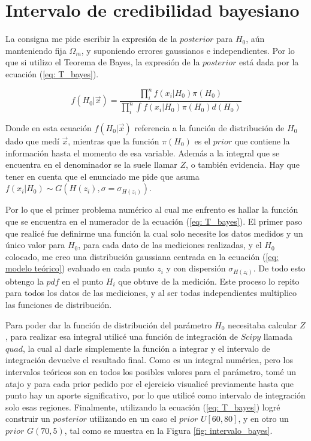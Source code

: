 \documentclass[]{article}
\begin{document}
\section{Intervalo de credibilidad bayesiano}
La consigna me pide escribir la expresión de la $posterior$ para $H_0$, aún manteniendo fija $\Omega_m$, y suponiendo errores gaussianos e independientes. Por lo que si
utilizo el Teorema de Bayes, la expresión de la $posterior$ está dada por la ecuación (\ref{eq: T_bayes}).

\begin{equation}
    f\left(H_0 | \vec{x}\right) = \frac{\prod_{i}^{n} f\left( x_i | H_0 \right) \pi\left(H_0\right)}{\prod_{i}^{n} \int f\left( x_i | H_0 \right) \pi\left(H_0\right)d\left(H_0\right)} 
    \label{eq: T_bayes}
\end{equation}

Donde en esta ecuación $f\left(H_0 | \vec{x}\right)$ referencia a la función de distribución de $H_0$ dado que medí $\vec{x}$, mientras que la función $\pi\left(H_0\right)$
es el $prior$ que contiene la información hasta el momento de esa variable. Además a la integral que se encuentra en el denominador se la suele llamar $Z$, o también
evidencia. Hay que tener en cuenta que el enunciado me pide que asuma $f\left(x_i | H_0\right) \sim G\left( H\left(z_i\right), \sigma = \sigma_{H\left(z_i\right)} \right)$. 

Por lo que el primer problema numérico al cual me enfrento es hallar la función que se encuentra en el numerador de la ecuación (\ref{eq: T_bayes}). El primer paso que realicé fue
definirme una función la cual solo necesite los datos medidos y un único valor para $H_0$, para cada dato de las mediciones realizadas, y el $H_0$ colocado, me creo una distribución
gaussiana centrada en la ecuación (\ref{eq: modelo teórico}) evaluado en cada punto $z_i$ y con dispersión $\sigma_{H\left(z_i\right)}$. De todo esto obtengo la $pdf$ en el punto
$H_i$ que obtuve de la medición. Este proceso lo repito para todos los datos de las mediciones, y al ser todas independientes multiplico las funciones de distribución.

Para poder dar la función de distribución del parámetro $H_0$ necesitaba calcular $Z$, para realizar esa integral utilicé una función de integración de $Scipy$ llamada $quad$, la
cual al darle simplemente la función a integrar y el intervalo de integración devuelve el resultado final. Como es un integral numérica, pero los intervalos teóricos son en todos
los posibles valores para el parámetro, tomé un atajo y para cada prior pedido por el ejercicio visualicé previamente hasta que punto hay un aporte significativo, por lo que utilicé como
intervalo de integración solo esas regiones.  Finalmente, utilizando la ecuación (\ref{eq: T_bayes}) logré construir un $posterior$ utilizando en un caso el $prior$ $U\left[60, 80\right]$, 
y en otro un $prior$ $G\left(70, 5\right)$, tal como se muestra en la Figura \ref{fig: intervalo_bayes}.
\end{document}
